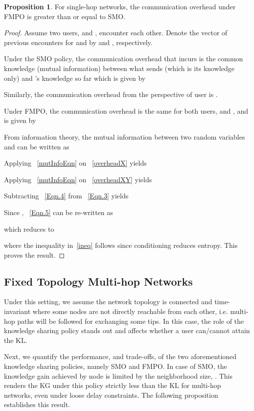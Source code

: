 \documentclass[conference]{IEEEtran}
\theoremstyle{definition}
\newtheorem{prop}{Proposition}
\begin{document}
\begin{prop}
For single-hop networks, the communication overhead under FMPO is greater than or equal to SMO.
\end{prop}
\vspace{-0.2 cm}
\begin{proof}
Assume two users,  and , encounter each other. Denote the vector of previous encounters for  and  by  and , respectively.

Under the SMO policy, the communication overhead that  incurs is the common knowledge (mutual information) between what  sends (which is its knowledge only) and 's
knowledge so far which is given by 

Similarly, the communication overhead from the perspective of user  is .

Under FMPO, the communication overhead is the same for both users,  and , and is given by


From information theory, the mutual information between two random variables  and  can be written as

Applying ~\eqref{mutInfoEqn} on ~\eqref{overheadX} yields

Applying ~\eqref{mutInfoEqn} on ~\eqref{overheadXY} yields


Subtracting ~\eqref{Eqn.4} from ~\eqref{Eqn.3} yields 


Since , ~\eqref{Eqn.5} can be re-written as


which reduces to 


where the inequality in~\eqref{ineq} follows since conditioning reduces entropy. This proves the result.
\end{proof}


\vspace{-0.2 cm}
\subsection{Fixed Topology Multi-hop Networks}
Under this setting, we assume the network topology is connected and time-invariant where some nodes are not directly reachable from each other, i.e. multi-hop paths will be followed for exchanging 
some tips. In this case, the role of the knowledge sharing policy stands out and 
affects whether a user can/cannot attain the KL.


Next, we quantify the performance, and trade-offs, of the two aforementioned knowledge sharing policies, namely SMO and FMPO. In case of
SMO, the knowledge gain achieved by node  is limited by the neighborhood size, . This renders the KG under this policy strictly less than the KL for multi-hop networks, even under loose delay constraints. The following proposition establishes this result.
\end{document}
